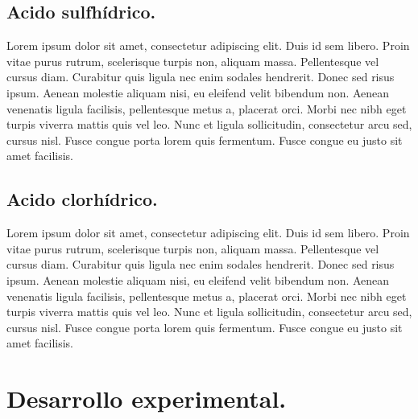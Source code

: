 \documentclass[letter]{article}
\begin{document}
\subsection{Acido sulfhídrico.}
Lorem ipsum dolor sit amet, consectetur adipiscing elit. Duis id sem libero. Proin vitae purus rutrum, scelerisque turpis non, aliquam massa. Pellentesque vel cursus diam. Curabitur quis ligula nec enim sodales hendrerit. Donec sed risus ipsum. Aenean molestie aliquam nisi, eu eleifend velit bibendum non. Aenean venenatis ligula facilisis, pellentesque metus a, placerat orci. Morbi nec nibh eget turpis viverra mattis quis vel leo. Nunc et ligula sollicitudin, consectetur arcu sed, cursus nisl. Fusce congue porta lorem quis fermentum. Fusce congue eu justo sit amet facilisis.\par
\subsection{Acido clorhídrico.}
Lorem ipsum dolor sit amet, consectetur adipiscing elit. Duis id sem libero. Proin vitae purus rutrum, scelerisque turpis non, aliquam massa. Pellentesque vel cursus diam. Curabitur quis ligula nec enim sodales hendrerit. Donec sed risus ipsum. Aenean molestie aliquam nisi, eu eleifend velit bibendum non. Aenean venenatis ligula facilisis, pellentesque metus a, placerat orci. Morbi nec nibh eget turpis viverra mattis quis vel leo. Nunc et ligula sollicitudin, consectetur arcu sed, cursus nisl. Fusce congue porta lorem quis fermentum. Fusce congue eu justo sit amet facilisis.\par
    


\section{Desarrollo experimental.}
\end{document}
